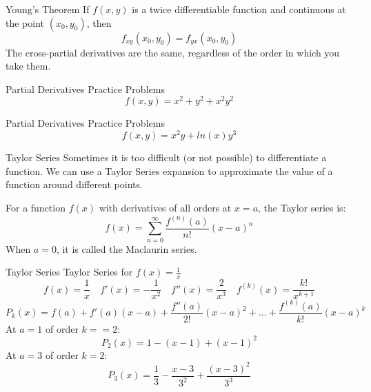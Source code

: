 \documentclass[aspectratio=169]{beamer}
\begin{document}
\begin{frame}{Young's Theorem}\label{main1}
    If $f(x, y)$ is a twice differentiable function and continuous at the point $(x_0, y_0)$, then
    \[
    f_{xy}(x_0, y_0) = f_{yx}(x_0, y_0)
    \]
    The cross-partial derivatives are the same, regardless of the order in which you take them.
\end{frame}

\begin{frame}{Partial Derivatives Practice Problems}\label{main1}
	\vspace{-4cm}
     \[
    f(x,y) = x^{2} + y^{2} + x^{2}y^{2}
    \]
\end{frame}

\begin{frame}{Partial Derivatives Practice Problems}\label{main1}
	\vspace{-4cm}
     \[
    f(x,y) = x^{2}y+ln(x)y^{3}
    \]
\end{frame}

\begin{frame}{Taylor Series}\label{main1}
Sometimes it is too difficult (or not possible) to differentiate a function.  We can use a Taylor Series expansion to approximate the value of a function around different points.

For a function $f(x)$ with derivatives of all orders at $x=a$, the Taylor series is:
\[
f(x) = \sum_{n=0}^{\infty} \frac{f^{(n)}(a)}{n!} (x - a)^n
\]
When $a=0$, it is called the Maclaurin series.

\end{frame}

\begin{frame}{Taylor Series}\label{main1}
Taylor Series for $f(x) = \frac{1}{x}$
\[
f(x) = \frac{1}{x} \quad f'(x) = -\frac{1}{x^2} \quad f''(x) = \frac{2}{x^3} \quad f^{(k)}(x) = \frac{k!}{x^{k+1}}
\]
\[
P_k(x) = f(a) + f'(a)(x - a) + \frac{f''(a)}{2!}(x - a)^2 + \ldots + \frac{f^{(k)}(a)}{k!}(x - a)^k
\]
At $a=1$ of order $k==2$:
\[
P_2(x) = 1 - (x - 1) + (x - 1)^2
\]
At $a=3$ of order $k=2$:
\[
P_3(x) = \frac{1}{3} - \frac{x - 3}{3^2} + \frac{(x - 3)^2}{3^3}
\]

\end{frame}
\end{document}
